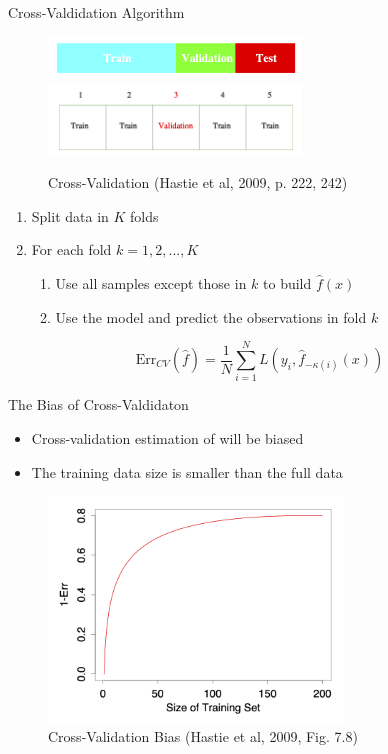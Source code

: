 \documentclass[10pt]{beamer}
\begin{document}
\begin{frame}{Cross-Valdidation Algorithm}

\begin{figure}[h]
\caption{Cross-Validation (Hastie et al, 2009, p. 222, 242)}
\centering
\includegraphics[width=0.6\textwidth]{figs/ESL_test_train_val.png}
\includegraphics[width=0.6\textwidth]{figs/ESL_cross_val.png}
\end{figure}

\begin{enumerate}
\item Split data in $K$ folds
\item For each fold $k=1,2,...,K$
\begin{enumerate}
\item Use all samples except those in $k$ to build $\hat{f}(x)$
\item Use the model and predict the observations in fold $k$
\end{enumerate}
\end{enumerate}

\[
\text{Err}_{CV}(\hat{f}) = \frac{1}{N}\sum^N_{i=1} L(y_i,\hat{f}_{-\kappa(i)}(x))
\]

\end{frame}

\begin{frame}{The Bias of Cross-Valdidaton}

\begin{itemize}
\item Cross-validation estimation of  will be biased
\item The training data size is smaller than the full data
\end{itemize}

\begin{figure}[h]
\caption{Cross-Validation Bias (Hastie et al, 2009, Fig. 7.8)}
\centering
\includegraphics[width=0.7\textwidth]{figs/ESL_7_8.png}
\end{figure}

\end{frame}
\end{document}
